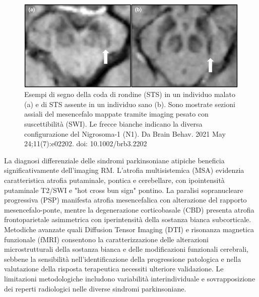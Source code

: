 \begin{figure}[h]
	\centering
	\includegraphics[width=0.8\linewidth]{FileAusiliari/Immagini/degenerative/BRB3-11-e02202-g002}
	\caption[Swallow-tail sign Parkinson]{Esempi di segno della coda di rondine (STS) in un individuo malato (a) e di STS assente in un individuo sano (b). Sono mostrate sezioni assiali del mesencefalo mappate tramite imaging pesato con suscettibilità (SWI). Le frecce bianche indicano la diversa configurazione del Nigrosoma-1 (N1). Da Brain Behav. 2021 May 24;11(7):e02202. doi: 10.1002/brb3.2202}
	\label{fig:brb3-11-e02202-g002}
\end{figure}

La diagnosi differenziale delle sindromi parkinsoniane atipiche beneficia significativamente dell'imaging RM. L'atrofia multisistemica (MSA) evidenzia caratteristica atrofia putaminale, pontica e cerebellare, con ipointensità putaminale T2/SWI e "hot cross bun sign" pontino. La paralisi sopranucleare progressiva (PSP) manifesta atrofia mesencefalica con alterazione del rapporto mesencefalo-ponte, mentre la degenerazione corticobasale (CBD) presenta atrofia frontoparietale asimmetrica con iperintensità della sostanza bianca subcorticale.
Metodiche avanzate quali Diffusion Tensor Imaging (DTI) e risonanza magnetica funzionale (fMRI) consentono la caratterizzazione delle alterazioni microstrutturali della sostanza bianca e delle modificazioni funzionali cerebrali, sebbene la sensibilità nell'identificazione della progressione patologica e nella valutazione della risposta terapeutica necessiti ulteriore validazione. Le limitazioni metodologiche includono variabilità interindividuale e sovrapposizione dei reperti radiologici nelle diverse sindromi parkinsoniane.

